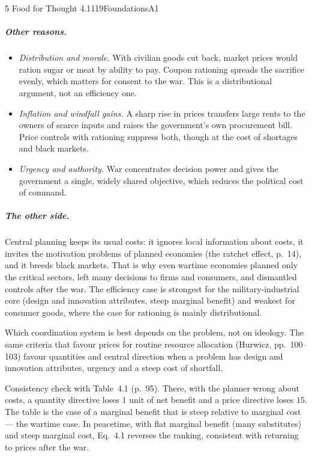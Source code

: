 \begin{exsol}{5}{\MR{} Food for Thought 4.1}{119}{Foundations}{A1}
\subparagraph{Other reasons.}
\begin{itemize}
  \item \emph{Distribution and morale.} With civilian goods cut back, market prices would ration
    sugar or meat by ability to pay. Coupon rationing spreads the sacrifice evenly, which matters
    for consent to the war. This is a distributional argument, not an efficiency one.
  \item \emph{Inflation and windfall gains.} A sharp rise in prices transfers large rents to the
    owners of scarce inputs and raises the government's own procurement bill. Price controls with
    rationing suppress both, though at the cost of shortages and black markets.
  \item \emph{Urgency and authority.} War concentrates decision power and gives the government
    a single, widely shared objective, which reduces the political cost of command.
\end{itemize}

\subparagraph{The other side.} Central planning keeps its usual costs: it ignores local
information about costs, it invites the motivation problems of planned economies (the ratchet
effect, p.~14), and it breeds black markets. That is why even wartime economies planned only the
critical sectors, left many decisions to firms and consumers, and dismantled controls after the
war. The efficiency case is strongest for the military-industrial core (design and innovation
attributes, steep marginal benefit) and weakest for consumer goods, where the case for rationing
is mainly distributional.

\interp Which coordination system is best depends on the problem, not on ideology. The same
criteria that favour prices for routine resource allocation (Hurwicz, pp.~100--103) favour
quantities and central direction when a problem has design and innovation attributes, urgency and
a steep cost of shortfall.

\verify Consistency check with Table~4.1 (p.~95). There, with the planner wrong about costs, a
quantity directive loses $1$ unit of net benefit and a price directive loses $15$. The table is
the case of a marginal benefit that is steep relative to marginal cost --- the wartime case. In
peacetime, with flat marginal benefit (many substitutes) and steep marginal cost, Eq.~4.1 reverses
the ranking, consistent with returning to prices after the war.

\end{exsol}
